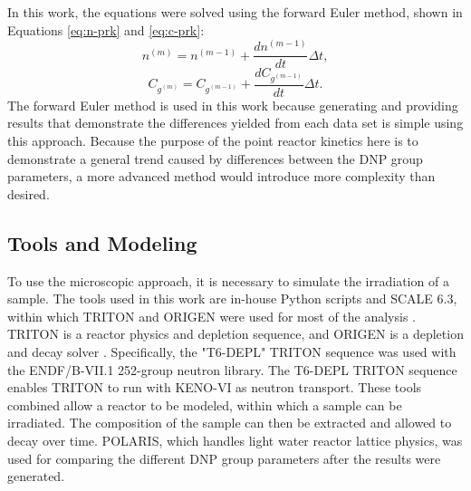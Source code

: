 \documentclass{style/nseJournal}
\begin{document}
In this work, the equations were solved using the forward Euler method, shown in Equations \eqref{eq:n-prk} and \eqref{eq:c-prk}:
\begin{equation}
n^{(m)} = n^{(m-1)} + \frac{dn^{(m-1)}}{dt} \Delta t
\label{eq:n-prk},
\end{equation}
\begin{equation}
C_{g^{(m)}} = C_{g^{(m-1)}} + \frac{dC_{g^{(m-1)}}}{dt} \Delta t
\label{eq:c-prk}.
\end{equation}
The forward Euler method is used in this work because generating and providing results that demonstrate the differences yielded from each data set is simple using this approach.
Because the purpose of the point reactor kinetics here is to demonstrate a general trend caused by differences between the DNP group parameters, a more advanced method would introduce more complexity than desired.

\subsection{Tools and Modeling}
\label{sec:tools}

To use the microscopic approach, it is necessary to simulate the irradiation of a sample.
The tools used in this work are in-house Python scripts and SCALE 6.3, within which TRITON and ORIGEN were used for most of the analysis \cite{scripts}. TRITON is a reactor physics and depletion sequence, and ORIGEN is a depletion and decay solver \cite{wieselquist_scale_2023}. Specifically, the "T6-DEPL" TRITON sequence was used with the ENDF/B-VII.1 252-group neutron library.
The T6-DEPL TRITON sequence enables TRITON to run with KENO-VI as neutron transport. These tools combined allow a reactor to be modeled, within which a sample can be irradiated. The composition of the sample can then be extracted and allowed to decay over time.
POLARIS, which handles light water reactor lattice physics, was used for comparing the different DNP group parameters after the results were generated.
\end{document}
